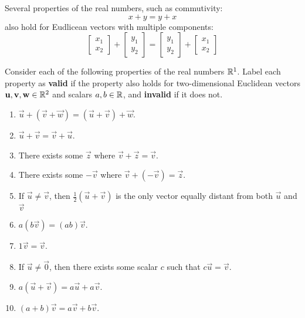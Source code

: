 

\begin{observation}
Several properties of the real numbers, such as commutivity:
\[
  x + y = y + x
\]
also hold for Eudlicean vectors with multiple components:
\[
\begin{bmatrix}x_1\\x_2\end{bmatrix}
+
\begin{bmatrix}y_1\\y_2\end{bmatrix}
=
\begin{bmatrix}y_1\\y_2\end{bmatrix}
+
\begin{bmatrix}x_1\\x_2\end{bmatrix}
\]
\end{observation}

\begin{activity}{20}\smallSlideText
Consider each of the following properties of the real numbers
\(\mathbb{R}^1\). Label each property as \textbf{valid} if the property also
holds for two-dimensional Euclidean vectors 
\(\mathbf u,\mathbf v,\mathbf w\in\mathbb{R}^2\) and scalars \(a,b\in\mathbb{R}\),
and \textbf{invalid} if it does not.
\begin{multicols}{2}
\begin{enumerate}
  \item \(\vec u+(\vec v+\vec w)=
        (\vec u+\vec v)+\vec w\).
  \item \(\vec u+\vec v=
        \vec v+\vec u\).
  \item There exists some \(\vec z\)
        where \(\vec v+\vec z=\vec v\).
  \item There exists some \(-\vec v\)
        where \(\vec v+(-\vec v)=\vec z\).
  \item If \(\vec u\not=\vec v\), then \(\frac{1}{2}(\vec u+\vec v)\)
        is the only vector equally distant from both \(\vec u\) and \(\vec v\)
  \item \(a(b\vec v)=(ab)\vec v\).
  \item \(1\vec v=\vec v\).
  \item If \(\vec u\not=\vec 0\), then there exists some scalar \(c\) 
        such that \(c\vec u=\vec v\).
  \item \(a(\vec u+\vec v)=a\vec u+a\vec v\).
  \item \((a+b)\vec v=a\vec v+b\vec v\).
\end{enumerate}
\end{multicols}
\end{activity}

